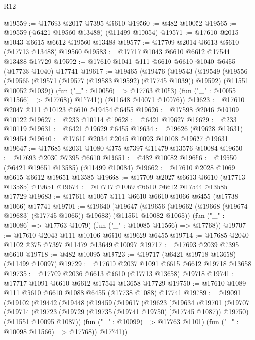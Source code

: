 \begin{lexlean}{R12}
\begin{coremodule}
{{{{{{{{{{{{{{{{{{{{{{{{{{{{{{{{{{{{{{{{{{{{{{{{{{{{{{{{{{{{{{{{{{{{{{{{{{{{{{{{{{@19559 := @17693 @2017 @7395 @6610
@19560 := @482 @10052
@19565 := @19559 (@6421 @19560 @13488) (@11499 @10054)
@19571 := @17610 @2015 @1043 @6615 @6612 @19560 @13488
@19577 := @17709 @2014 @6613 @6610 (@17713 @13488) @19560
@19583 := @17717 @1043 @6610 @6612 @17544 @13488 @17729
@19592 := @17610 @1041 @111 @6610 @6610 @1040 @6455 (@17738 @1040) @17741
@19617 := @19465
    (@19476
      (@19543
        (@19549
          (@19556
            (@19565 (@19571 (@19577 (@19583 @19592) (@17745 @1039)) @19592) (@11551 @10052 @1039))
            (fun ("_" : @10056) => @17763 @1053)
            (fun ("_" : @10055 @11566) => @17768))
          @17741))
      (@11648 @10071 @10076))
@19623 := @17610 @2047 @111 @10123 @6610 @19454 @6455
@19626 := @17598 @2046 @10109 @10122
@19627 := @233 @10114
@19628 := @6421 @19627
@19629 := @233 @10119
@19631 := @6421 @19629 @6455
@19634 := @19626 (@19628 @19631) @19454
@19640 := @17610 @2034 @2045 @10093 @10108 @19627 @19631
@19647 := @17685 @2031 @1080 @375 @7397 @11479 @13576 @10084
@19650 := @17693 @2030 @7395 @6610
@19651 := @482 @10082
@19656 := @19650 (@6421 @19651 @13585) (@11499 @10084)
@19662 := @17610 @2028 @1069 @6615 @6612 @19651 @13585
@19668 := @17709 @2027 @6613 @6610 (@17713 @13585) @19651
@19674 := @17717 @1069 @6610 @6612 @17544 @13585 @17729
@19683 := @17610 @1067 @111 @6610 @6610 @1066 @6455 (@17738 @1066) @17741
@19701 := @19640
    (@19647
      (@19656 (@19662 (@19668 (@19674 @19683) (@17745 @1065)) @19683) (@11551 @10082 @1065))
      (fun ("_" : @10086) => @17763 @1079)
      (fun ("_" : @10085 @11566) => @17768))
@19707 := @17610 @2043 @111 @10106 @6610 @19629 @6455
@19714 := @17685 @2040 @1102 @375 @7397 @11479 @13649 @10097
@19717 := @17693 @2039 @7395 @6610
@19718 := @482 @10095
@19723 := @19717 (@6421 @19718 @13658) (@11499 @10097)
@19729 := @17610 @2037 @1091 @6615 @6612 @19718 @13658
@19735 := @17709 @2036 @6613 @6610 (@17713 @13658) @19718
@19741 := @17717 @1091 @6610 @6612 @17544 @13658 @17729
@19750 := @17610 @1089 @111 @6610 @6610 @1088 @6455 (@17738 @1088) @17741
@19789 := @19091
    (@19102
      (@19442
        (@19448
          (@19459
            (@19617
              (@19623
                (@19634
                  (@19701
                    (@19707
                      (@19714
                        (@19723
                          (@19729 (@19735 (@19741 @19750) (@17745 @1087)) @19750)
                          (@11551 @10095 @1087))
                        (fun ("_" : @10099) => @17763 @1101)
                        (fun ("_" : @10098 @11566) => @17768))
                      @17741))
}}}}}}}}}}}}}}}}}}}}}}}}}}}}}}}}}}}}}}}}}}}}}}}}}}}}}}}}}}}}}}}}}}}}}}}}}}}}}}}}}}
\end{coremodule}
\end{lexlean}
